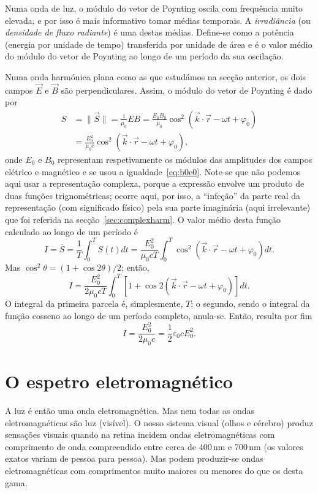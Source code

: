 Numa onda de luz, o módulo do vetor de Poynting oscila com frequência muito
elevada, e por isso é mais informativo tomar médias temporais. A
\emph{irradiância} (ou \emph{densidade de fluxo radiante}) é uma destas médias.
Define-se como a potência (energia por unidade de tempo) transferida por unidade
de área e é o valor médio do módulo do vetor de Poynting ao longo de um período
da sua oscilação.

Numa onda harmónica plana como as que estudámos na secção anterior, os dois
campos $\vec E$ e $\vec B$ são perpendiculares. Assim, o módulo do vetor de
Poynting é dado por
\begin{align*}
  S&=\|\vec S\|=\frac{1}{\mu_0}EB=
  \frac{E_0B_0}{\mu_0}\cos^2\left(\vec k\cdot\vec r-\omega t+\varphi_0\right)\\
  &=
  \frac{E^2_0}{\mu_0c}\cos^2\left(\vec k\cdot\vec r-\omega t+\varphi_0\right),
\end{align*}
onde $E_0$ e $B_0$ representam respetivamente os módulos das amplitudes dos
campos elétrico e magnético e se usou a igualdade~\eqref{eq:b0e0}. Note-se que
não podemos aqui usar a representação complexa, porque a expressão envolve um
produto de duas funções trignométricas; ocorre aqui, por isso, a ``infeção'' da
parte real da representação (com significado físico) pela sua parte imaginária
(aqui irrelevante) que foi referida na secção~\ref{sec:complexharm}.  O
valor médio desta função calculado ao longo de um período é
\begin{equation*}
  I=\overline S=\frac{1}{T}\int_{0}^TS(t)dt=\frac{E_0^2}{\mu_0cT}
  \int_0^T\cos^2\left(\vec k\cdot\vec r-\omega t+\varphi_0\right)dt.
\end{equation*}
Mas $\cos^2\theta=(1+\cos2\theta)/2$; então,
\begin{equation*}
  I=\frac{E_0^2}{2\mu_0cT}
  \int_0^T\left[1+\cos2\left(\vec k\cdot\vec r-\omega t+\varphi_0\right)\right]dt.
\end{equation*}
O integral da primeira parcela é, simplesmente, $T$; o segundo, sendo o integral
da função cosseno ao longo de um período completo, anula-se. Então, resulta por
fim
\begin{equation}\label{eq:irradiance}
  I=\frac{E_0^2}{2\mu_0c}=\frac{1}{2}\varepsilon_0cE_0^2.
\end{equation}



\section{O espetro eletromagnético}
A luz é então uma onda eletromagnética. Mas nem todas as ondas eletromagnéticas
são luz (visível). O nosso sistema visual (olhos e cérebro) produz sensações
visuais quando na retina incidem ondas eletromagnéticas com comprimento de onda
compreendido entre cerca de 400\,nm e 700\,nm (os valores exatos variam de
pessoa para pessoa). Mas podem produzir-se ondas eletromagnéticas com
comprimentos muito maiores ou menores do que os desta gama.

